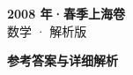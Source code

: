 \documentclass[zihao=-4, a4paper]{ctexart}
\begin{document}
\begin{center}
  {\Large\bfseries 2008 年·春季上海卷}\\[4pt]
  {\large 数学 · 解析版}
\end{center}
\medskip
{}

\clearpage
{}
\begin{center}{\Large\bfseries 参考答案与详细解析}\end{center}
\medskip

\end{document}
